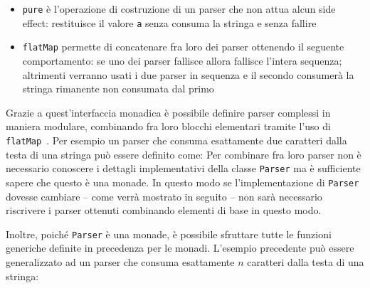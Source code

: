 \begin{itemize}
  \item \lstinline{pure} è l'operazione di costruzione di un parser che non attua alcun side effect: restituisce il valore \lstinline{a} senza consuma la stringa e senza fallire
  \item \lstinline{flatMap} permette di concatenare fra loro dei parser ottenendo il seguente comportamento: se uno dei parser fallisce allora fallisce l'intera sequenza; altrimenti verranno usati i due parser in sequenza e il secondo consumerà la stringa rimanente non consumata dal primo
\end{itemize}

Grazie a quest'interfaccia monadica è possibile definire parser complessi in maniera modulare, combinando fra loro blocchi elementari tramite l'uso di \lstinline{flatMap}~\cite{cit:monadic-parsing-in-haskell}. Per esempio un parser che consuma esattamente due caratteri dalla testa di una stringa può essere definito come:
Per combinare fra loro parser non è necessario conoscere i dettagli implementativi della classe \lstinline{Parser} ma è sufficiente sapere che questo è una monade. In questo modo se l'implementazione di \lstinline{Parser} dovesse cambiare -- come verrà mostrato in seguito -- non sarà necessario riscrivere i parser ottenuti combinando elementi di base in questo modo.

Inoltre, poiché \lstinline{Parser} è una monade, è possibile sfruttare tutte le funzioni generiche definite in precedenza per le monadi. L'esempio precedente può essere generalizzato ad un parser che consuma esattamente $n$ caratteri dalla testa di una stringa:

